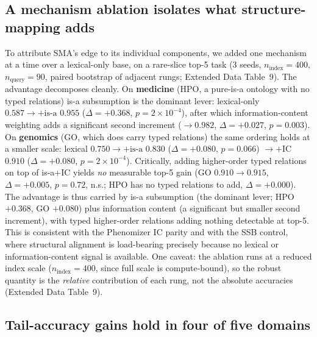 \documentclass[pdflatex,sn-nature]{sn-jnl}
\begin{document}
\subsection{A mechanism ablation isolates what structure-mapping adds}
 To attribute
SMA's edge to its individual components, we added one mechanism at a time over a
lexical-only base, on a rare-slice top-5 task (3 seeds, $n_\text{index}{=}400$,
$n_\text{query}{=}90$, paired bootstrap of adjacent rungs; Extended Data
Table~9). The advantage decomposes cleanly. On \textbf{medicine} (HPO, a pure-is-a
ontology with no typed relations) is-a subsumption is the dominant lever:
lexical-only $0.587 \to {+}\text{is-a}$ $0.955$ ($\Delta{=}{+}0.368$,
$p{=}2{\times}10^{-4}$), after which information-content weighting adds a
significant second increment ($\to 0.982$, $\Delta{=}{+}0.027$, $p{=}0.003$). On
\textbf{genomics} (GO, which does carry typed relations) the same ordering holds
at a smaller scale: lexical $0.750 \to {+}\text{is-a}$ $0.830$
($\Delta{=}{+}0.080$, $p{=}0.066$) $\to {+}\text{IC}$ $0.910$
($\Delta{=}{+}0.080$, $p{=}2{\times}10^{-4}$). Critically, adding higher-order
typed relations on top of is-a$+$IC yields \emph{no} measurable top-5 gain (GO
$0.910 \to 0.915$, $\Delta{=}{+}0.005$, $p{=}0.72$, n.s.; HPO has no typed
relations to add, $\Delta{=}{+}0.000$). The advantage is thus carried by is-a
subsumption (the dominant lever; HPO $+0.368$, GO $+0.080$) plus information
content (a significant but smaller second increment), with typed higher-order
relations adding nothing detectable at top-5. This is consistent with the
Phenomizer IC parity and with the SSB control, where structural alignment is
load-bearing precisely because no lexical or information-content signal is
available. One caveat: the ablation runs at a reduced index scale
($n_\text{index}{=}400$, since full scale is compute-bound), so the robust
quantity is the \emph{relative} contribution of each rung, not the absolute
accuracies (Extended Data Table~9).

\subsection{Tail-accuracy gains hold in four of five domains}
\end{document}

